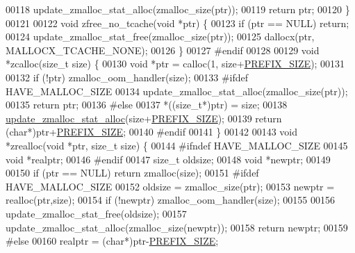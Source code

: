 \begin{DoxyCode}
{00118     update\_zmalloc\_stat\_alloc(zmalloc\_size(ptr));
00119     \textcolor{keywordflow}{return} ptr;
00120 \}
00121 
00122 \textcolor{keywordtype}{void} zfree\_no\_tcache(\textcolor{keywordtype}{void} *ptr) \{
00123     \textcolor{keywordflow}{if} (ptr == NULL) \textcolor{keywordflow}{return};
00124     update\_zmalloc\_stat\_free(zmalloc\_size(ptr));
00125     dallocx(ptr, MALLOCX\_TCACHE\_NONE);
00126 \}
00127 \textcolor{preprocessor}{#}\textcolor{preprocessor}{endif}
00128 
00129 \textcolor{keywordtype}{void} *zcalloc(size\_t size) \{
00130     \textcolor{keywordtype}{void} *ptr = calloc(1, size+\hyperlink{zmalloc_8c_abe208177340b58cb5096daabe07922d1}{PREFIX\_SIZE});
00131 
00132     \textcolor{keywordflow}{if} (!ptr) zmalloc\_oom\_handler(size);
00133 \textcolor{preprocessor}{#}\textcolor{preprocessor}{ifdef} \textcolor{preprocessor}{HAVE\_MALLOC\_SIZE}
00134     update\_zmalloc\_stat\_alloc(zmalloc\_size(ptr));
00135     \textcolor{keywordflow}{return} ptr;
00136 \textcolor{preprocessor}{#}\textcolor{preprocessor}{else}
00137     *((size\_t*)ptr) = size;
00138     \hyperlink{zmalloc_8c_adc62adb8ec66924b8eaf16c123e1eb9c}{update\_zmalloc\_stat\_alloc}(size+\hyperlink{zmalloc_8c_abe208177340b58cb5096daabe07922d1}{PREFIX\_SIZE});
00139     \textcolor{keywordflow}{return} (\textcolor{keywordtype}{char}*)ptr+\hyperlink{zmalloc_8c_abe208177340b58cb5096daabe07922d1}{PREFIX\_SIZE};
00140 \textcolor{preprocessor}{#}\textcolor{preprocessor}{endif}
00141 \}
00142 
00143 \textcolor{keywordtype}{void} *zrealloc(\textcolor{keywordtype}{void} *ptr, size\_t size) \{
00144 \textcolor{preprocessor}{#}\textcolor{preprocessor}{ifndef} \textcolor{preprocessor}{HAVE\_MALLOC\_SIZE}
00145     \textcolor{keywordtype}{void} *realptr;
00146 \textcolor{preprocessor}{#}\textcolor{preprocessor}{endif}
00147     size\_t oldsize;
00148     \textcolor{keywordtype}{void} *newptr;
00149 
00150     \textcolor{keywordflow}{if} (ptr == NULL) \textcolor{keywordflow}{return} zmalloc(size);
00151 \textcolor{preprocessor}{#}\textcolor{preprocessor}{ifdef} \textcolor{preprocessor}{HAVE\_MALLOC\_SIZE}
00152     oldsize = zmalloc\_size(ptr);
00153     newptr = realloc(ptr,size);
00154     \textcolor{keywordflow}{if} (!newptr) zmalloc\_oom\_handler(size);
00155 
00156     update\_zmalloc\_stat\_free(oldsize);
00157     update\_zmalloc\_stat\_alloc(zmalloc\_size(newptr));
00158     \textcolor{keywordflow}{return} newptr;
00159 \textcolor{preprocessor}{#}\textcolor{preprocessor}{else}
00160     realptr = (\textcolor{keywordtype}{char}*)ptr-\hyperlink{zmalloc_8c_abe208177340b58cb5096daabe07922d1}{PREFIX\_SIZE};
}
\end{DoxyCode}
